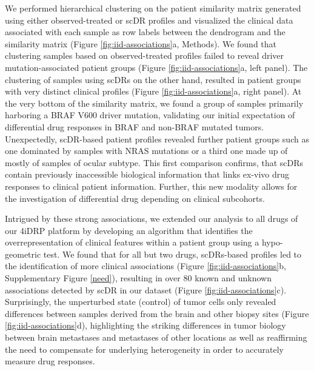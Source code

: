 We performed hierarchical clustering on the patient similarity matrix generated using either observed-treated or scDR profiles and visualized the clinical data associated with each sample as row labels between the dendrogram and the similarity matrix (Figure \ref{fig:iid-associations}a, Methods).
 We found that clustering samples based on observed-treated profiles failed to reveal driver mutation-associated patient groups (Figure \ref{fig:iid-associations}a, left panel).
 The clustering of samples using scDRs on the other hand, resulted in patient groups with very distinct clinical profiles (Figure \ref{fig:iid-associations}a, right panel).
 At the very bottom of the similarity matrix, we found a group of samples primarily harboring a BRAF V600 driver mutation, validating our initial expectation of differential drug responses in BRAF and non-BRAF mutated tumors.
 Unexpectedly, scDR-based patient profiles revealed further patient groups such as one dominated by samples with NRAS mutations or a third one made up of mostly of samples of ocular subtype.
 This first comparison confirms, that scDRs contain previously inaccessible biological information that links ex-vivo drug responses to clinical patient information.
 Further, this new modality allows for the investigation of differential drug depending on clinical subcohorts. 

Intrigued by these strong associations, we extended our analysis to all drugs of our 4iDRP platform by developing an algorithm that identifies the overrepresentation of clinical features within a patient group using a hypo-geometric test.
 We found that for all but two drugs, scDRs-based profiles led to the identification of more clinical associations (Figure \ref{fig:iid-associations}b, Supplementary Figure \ref{need}), resulting in over 80 known and unknown associations detected by scDR in our dataset (Figure \ref{fig:iid-associations}c).
 Surprisingly, the unperturbed state (control) of tumor cells only revealed differences between samples derived from the brain and other biopsy sites (Figure \ref{fig:iid-associations}d), highlighting the striking differences in tumor biology between brain metastases and metastases of other locations \cite{31} as well as reaffirming the need to compensate for underlying heterogeneity in order to accurately measure drug responses.  


